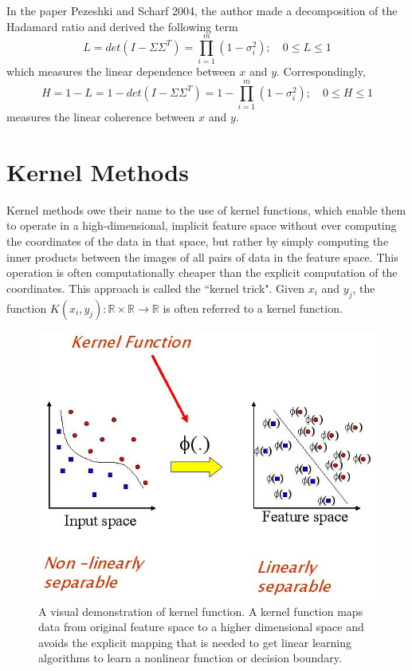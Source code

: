 \documentclass[12pt]{report} %
\begin{document}
In the paper Pezeshki and Scharf 2004\cite{ECCA}, the author made a decomposition of the Hadamard ratio and derived the following term
\begin{equation}
L=det(I-\Sigma\Sigma^T)=\prod_{i=1}^{m}(1-\sigma_{i}^2);\quad 0\leq L\leq 1
\end{equation}
which measures the linear dependence between $x$ and $y$. Correspondingly,
\begin{equation}
H=1-L=1-det(I-\Sigma\Sigma^T)=1-\prod_{i=1}^{m}(1-\sigma_{i}^2);\quad 0\leq H\leq 1
\end{equation}
measures the linear coherence between $x$ and $y$.

\section{Kernel Methods}
Kernel methods owe their name to the use of kernel functions, which enable them to operate in a high-dimensional, implicit feature space without ever computing the coordinates of the data in that space, but rather by simply computing the inner products between the images of all pairs of data in the feature space. This operation is often computationally cheaper than the explicit computation of the coordinates. This approach is called the ``kernel trick"\cite{PR}. Given $x_{i}$ and $y_{j}$, the function $K(x_{i},y_{j}): \mathbb{R} \times \mathbb{R} \to \mathbb{R}$ is often referred to a kernel function.
\begin{figure}[H]
	\centering
	\includegraphics[scale=0.6]{pictures/kernel.jpg}
	\caption{A visual demonstration of kernel function. A kernel function maps data from original feature space to a higher dimensional space and avoids the explicit mapping that is needed to get linear learning algorithms to learn a nonlinear function or decision boundary\cite{KPIC}.}
	\label{fig:4}
\end{figure}
\end{document}
